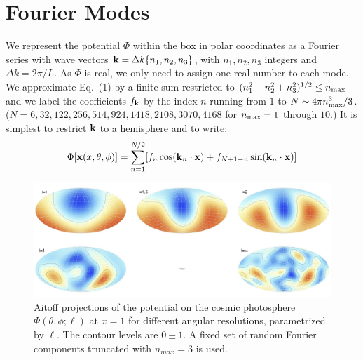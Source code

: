 \documentclass[12pt]{article}
\begin{document}
\section{Fourier Modes}
We represent the potential $\Phi$ within the box in polar coordinates as a Fourier series with wave vectors ${\bf k}=\Delta k\{n_1,n_2,n_3\}$, with $n_1,n_2,n_3$ integers and $\Delta k=2\pi/L$. As $\Phi$ is real, we only need to assign one real number to each mode. We approximate Eq.~(1) by a finite sum restricted to $(n_1^2+n_2^2+n_3^2)^{1/2}\le n_{\rm max}$ and we label the coefficients $f_{\bf k}$ by the index $n$ running from $1$ to $N\sim4\pi n_{\rm max}^3/3$. ($N=6,32,122, 256,514,924,1418,2108,3070,4168$ for $n_{\rm max}=1$ through $10$.) It is simplest to restrict ${\bf k}$ to a hemisphere and to write:
\begin{equation}
\Phi[{\bf x}(x,\theta,\phi)]=\sum_{n=1}^{N/2}[f_n\cos({\bf k}_n\cdot{\bf x})+f_{N+1-n}\sin({\bf k}_n\cdot{\bf x})]
\end{equation}
\begin{figure}[h!]
\centering
\includegraphics[width=6in]{fig1.jpg} 
\caption{Aitoff projections of the potential on the cosmic photosphere $\Phi(\theta,\phi;\ell)$ at $x=1$ for different angular resolutions, parametrized by $\ell$. The contour levels are $0\pm1$. A fixed set of random Fourier components truncated with $n_{max}=3$ is used.}
\end{figure}
\end{document}
